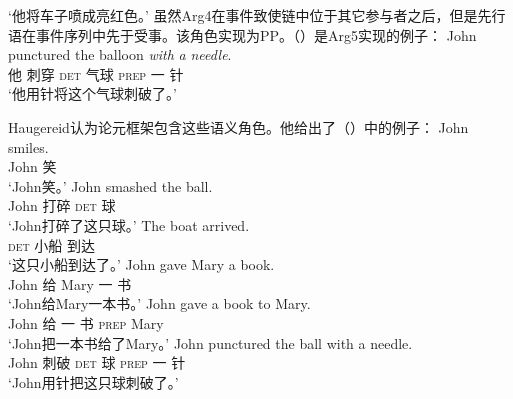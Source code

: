 \begin{exe}
\begin{xlist}[iv.]
\begin{exe}
\begin{xlist}[iv.]
\glt `他将车子喷成亮红色。'
\zl
虽然Arg4在事件致使链中位于其它参与者之后，但是先行语在事件序列中先于受事。该角色实现为PP。（）是Arg5实现的例子：
\ea
\gll John punctured the balloon \emph{with} \emph{a} \emph{needle}.\\
     他 刺穿 \textsc{det} 气球 \textsc{prep} 一 针\\
\glt `他用针将这个气球刺破了。'
\z

\noindent
Haugereid认为论元框架包含这些语义角色。他给出了（）中的例子：
\eal
\settowidth{}
\ex 
\gll John smiles.           \\
     John 笑\\
\glt `John笑。'
\ex 
\gll John smashed the ball. \\
     John 打碎 \textsc{det} 球\\
\glt `John打碎了这只球。'
\ex 
\gll The boat arrived.      \\
     \textsc{det} 小船 到达\\
\glt `这只小船到达了。'
\ex
\gll John gave Mary a book. \\
     John 给 Mary 一 书\\
\glt `John给Mary一本书。'
\ex 
\gll John gave a book to Mary. \\
     John 给 一 书 \textsc{prep} Mary\\
\glt `John把一本书给了Mary。'
\ex
\gll John punctured the ball with a needle. \\
     John 刺破 \textsc{det} 球 \textsc{prep} 一 针\\
\glt `John用针把这只球刺破了。' 
\zl


\end{xlist}
\end{exe}
\end{xlist}
\end{exe}

